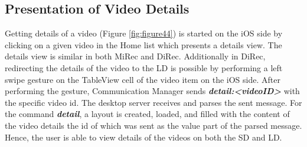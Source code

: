 \subsection{Presentation of Video Details}
Getting details of a video (Figure \ref{fig:figure44}) is started on the iOS
side by clicking on a given video in the Home list which presents a details view. The details view is
similar in both MiRec and DiRec. Additionally in DiRec, redirecting the details
of the video to the LD is possible by performing a left swipe gesture on the
TableView cell of the video item on the iOS side. After performing the gesture,
Communication Manager sends \textbf{\textit{detail:<videoID>}} with the specific
video id. The desktop server receives and parses the sent message. For the
command \textbf{\textit{detail}}, a layout is created, loaded, and filled with
the content of the video details the id of which was sent as the value part of
the parsed message. Hence, the user is able to view details of the videos on
both the SD and LD.
